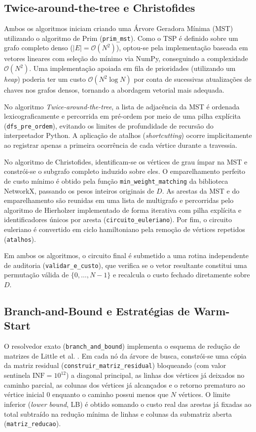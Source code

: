 \documentclass[12pt]{article}
\begin{document}
\subsection{Twice-around-the-tree e Christofides}

Ambos os algoritmos iniciam criando uma Árvore Geradora Mínima (MST) utilizando o algoritmo de Prim (\texttt{prim\_mst}). Como o TSP é definido sobre um grafo completo denso ($|E| = \mathcal{O}(N^2)$), optou-se pela implementação baseada em vetores lineares com seleção do mínimo via NumPy, conseguindo a complexidade $\mathcal{O}(N^2)$. Uma implementação apoiada em fila de prioridades (utilizando um \textit{heap}) poderia ter um custo $\mathcal{O}(N^2 \log N)$ por conta de sucessivas atualizações de chaves nos grafos densos, tornando a abordagem vetorial mais adequada.

No algoritmo \textit{Twice-around-the-tree}, a lista de adjacência da MST é ordenada lexicograficamente e percorrida em pré-ordem por meio de uma pilha explícita (\texttt{dfs\_pre\_ordem}), evitando os limites de profundidade de recursão do interpretador Python. A aplicação de atalhos (\textit{shortcutting}) ocorre implicitamente ao registrar apenas a primeira ocorrência de cada vértice durante a travessia.

No algoritmo de Christofides, identificam-se os vértices de grau ímpar na MST e constrói-se o subgrafo completo induzido sobre eles. O emparelhamento perfeito de custo mínimo é obtido pela função \texttt{min\_weight\_matching} da biblioteca NetworkX, passando os pesos inteiros originais de $D$. As arestas da MST e do emparelhamento são reunidas em uma lista de multigrafo e percorridas pelo algoritmo de Hierholzer implementado de forma iterativa com pilha explícita e identificadores únicos por aresta (\texttt{circuito\_euleriano}). Por fim, o circuito euleriano é convertido em ciclo hamiltoniano pela remoção de vértices repetidos (\texttt{atalhos}).

Em ambos os algoritmos, o circuito final é submetido a uma rotina independente de auditoria (\texttt{validar\_e\_custo}), que verifica se o vetor resultante constitui uma permutação válida de $\{0, \dots, N-1\}$ e recalcula o custo fechado diretamente sobre $D$.

\subsection{Branch-and-Bound e Estratégias de Warm-Start}

O resolvedor exato (\texttt{branch\_and\_bound}) implementa o esquema de redução de matrizes de Little et al. . Em cada nó da árvore de busca, constrói-se uma cópia da matriz residual (\texttt{construir\_matriz\_residual}) bloqueando (com valor sentinela $\text{INF} = 10^{12}$) a diagonal principal, as linhas dos vértices já deixados no caminho parcial, as colunas dos vértices já alcançados e o retorno prematuro ao vértice inicial $0$ enquanto o caminho possui menos que $N$ vértices. O limite inferior (\textit{lower bound}, LB) é obtido somando o custo real das arestas já fixadas ao total subtraído na redução mínima de linhas e colunas da submatriz aberta (\texttt{matriz\_reducao}).
\end{document}
